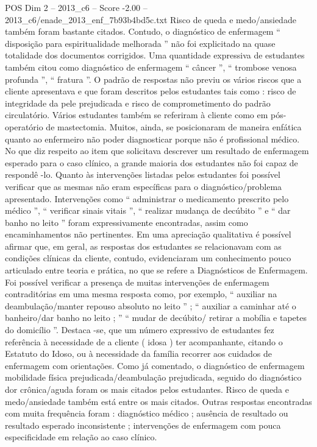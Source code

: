 \begin{textsample}{POS Dim 2 – 2013\_c6 – Score -2.00 – 2013\_c6/enade\_2013\_enf\_7b93b4bd5c.txt}
Risco de queda e medo/ansiedade também foram bastante citados.
Contudo, o diagnóstico de enfermagem “ disposição para espiritualidade melhorada ” não foi explicitado na quase totalidade dos documentos corrigidos.
Uma quantidade expressiva de estudantes também citou como diagnóstico de enfermagem “ câncer ”, “ trombose venosa profunda ”, “ fratura ”.
O padrão de respostas não previu os vários riscos que a cliente apresentava e que foram descritos pelos estudantes tais como : risco de integridade da pele prejudicada e risco de comprometimento do padrão circulatório.
Vários estudantes também se referiram à cliente como em pós-operatório de mastectomia.
Muitos, ainda, se posicionaram de maneira enfática quanto ao enfermeiro não poder diagnosticar porque não é profissional médico.
No que diz respeito ao item que solicitava descrever um resultado de enfermagem esperado para o caso clínico, a grande maioria dos estudantes não foi capaz de respondê -lo.
Quanto às intervenções listadas pelos estudantes foi possível verificar que as mesmas não eram específicas para o diagnóstico/problema apresentado.
Intervenções como “ administrar o medicamento prescrito pelo médico ”, “ verificar sinais vitais ”, “ realizar mudança de decúbito ” e “ dar banho no leito ” foram expressivamente encontradas, assim como encaminhamentos não pertinentes.
Em uma apreciação qualitativa é possível afirmar que, em geral, as respostas dos estudantes se relacionavam com as condições clínicas da cliente, contudo, evidenciaram um conhecimento pouco articulado entre teoria e prática, no que se refere a Diagnósticos de Enfermagem.
Foi possível verificar a presença de muitas intervenções de enfermagem contraditórias em uma mesma resposta como, por exemplo, “ auxiliar na deambulação/manter repouso absoluto no leito ” ; “ auxiliar a caminhar até o banheiro/dar banho no leito ; ” “ mudar de decúbito/ retirar a mobília e tapetes do domicílio ”.
Destaca -se, que um número expressivo de estudantes fez referência à necessidade de a cliente ( idosa ) ter acompanhante, citando o Estatuto do Idoso, ou à necessidade da família recorrer aos cuidados de enfermagem com orientações.
Como já comentado, o diagnóstico de enfermagem mobilidade física prejudicada/deambulação prejudicada, seguido do diagnóstico dor crônica/aguda foram os mais citados pelos estudantes.
Risco de queda e medo/ansiedade também está entre os mais citados.
Outras respostas encontradas com muita frequência foram : diagnóstico médico ; ausência de resultado ou resultado esperado inconsistente ; intervenções de enfermagem com pouca especificidade em relação ao caso clínico.

\end{textsample}

